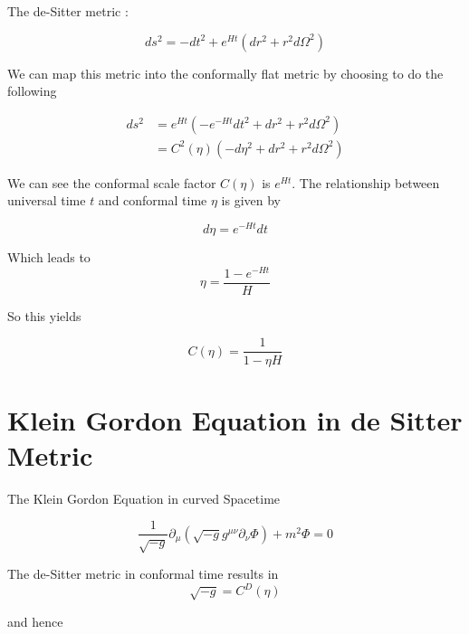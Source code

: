 The de-Sitter metric :

\begin{equation}
ds^2 = -dt^2 + e^{Ht}(dr^2 + r^2 d\Omega^2)
\end{equation}


We can map this metric into the conformally flat metric by choosing to do the following 

\begin{equation}\label{eq2}
\begin{split}
ds^2 & = e^{Ht}(-e^{-Ht}dt^2+ dr^2 +r^2 d\Omega^2) \\
&=C^2(\eta)(-d\eta^2 + dr^2 + r^2 d\Omega^2)
\end{split}
\end{equation}

We can see the conformal scale factor $C(\eta)$ is $e^{Ht}$. The relationship between universal time $t$ and conformal time $\eta$ is given by

\begin{equation}
d\eta = e ^{-Ht}dt
\end{equation}

Which leads to 
\begin{equation}
\eta = \frac{1 - e^{-Ht}}{H}
\end{equation}

So this yields 

\begin{equation}
C(\eta) = \frac{1}{1 - \eta H}
\end{equation}

\section{Klein Gordon Equation in de Sitter Metric}

The Klein Gordon Equation in curved Spacetime 

\begin{equation}
\frac{1}{\sqrt{-g}}\partial_\mu(\sqrt{-g}g^{\mu\nu}\partial_\nu\Phi) + m^2\Phi = 0
\end{equation}

The de-Sitter metric in conformal time results in 
\begin{equation}
\sqrt{-g} = C^D(\eta)
\end{equation}

and hence

